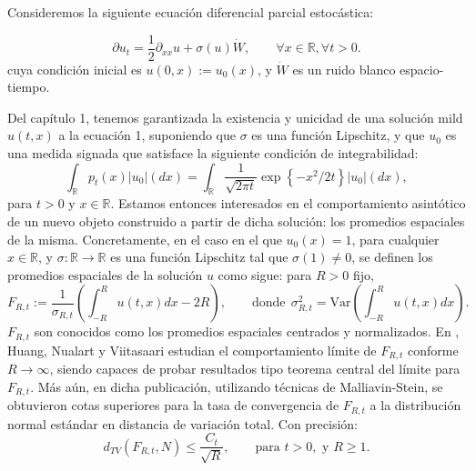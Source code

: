\documentclass[letterpaper,twoside]{book}
\newcommand{\R}{\mathbb{R}}
\newcommand{\1}{\mathds{1}}
\newcommand{\abs}[1]{\left\lvert #1 \right\rvert}
\renewcommand{\to}{\rightarrow}
\theoremstyle{definition}
\theoremstyle{definition}
\theoremstyle{definition}
\theoremstyle{definition}
\theoremstyle{definition}
\theoremstyle{definition}
\theoremstyle{definition}
\begin{document}
Consideremos la siguiente ecuación diferencial parcial estocástica:

\begin{equation}
\partial u_t=\frac{1}{2}\partial_{xx}u+\sigma(u)\dot{W}, \qquad \forall x\in \R, \forall t>0.
\end{equation}
cuya condición inicial es $u(0,x):=u_0(x)$, y $\dot{W}$ es un ruido blanco espacio-tiempo.

Del capítulo 1, tenemos garantizada la existencia y unicidad de una solución mild $u(t,x)$ a la ecuación 1, suponiendo que $\sigma$ es una función Lipschitz, y que $u_0$ es una medida signada que satisface la siguiente condición de integrabilidad:
\[
\int_\R p_t(x)\abs{u_0}(dx)=\int_\R\frac{1}{\sqrt{2\pi t}}\exp \left\{-x^2/2t\right\}\abs{u_0}(dx),    
\]
para $t>0$ y $x\in \R$. Estamos entonces interesados en el comportamiento asintótico de un nuevo objeto construido a partir de dicha solución: los promedios espaciales de la misma. Concretamente, en el caso en el que $u_0(x)=1$, para cualquier $x\in \R$, y $\sigma:\R\to\R$ es una función Lipschitz tal que $\sigma(1)\neq 0$, se definen los promedios espaciales de la solución $u$ como sigue: para $R>0$ fijo, 
\begin{equation}
    F_{R,t}:=\frac{1}{\sigma_{R,t}}\left(\int_{-R}^{R}u(t,x)dx -2R\right), \qquad \text{donde} \ \ \sigma^2_{R,t}=\text{Var}\left(\int_{-R}^{R}u(t,x)dx\right).
\end{equation}
$F_{R,t}$ son conocidos como los promedios espaciales centrados y normalizados. En \cite{HUANG20207170}, Huang, Nualart y Viitasaari estudian el comportamiento límite de $F_{R,t}$ conforme $R\to \infty$, siendo capaces de probar resultados tipo teorema central del límite para $F_{R,t}$. Más aún, en dicha publicación, utilizando técnicas de Malliavin-Stein, se obtuvieron cotas superiores para la tasa de convergencia de $F_{R,t}$ a la distribución normal estándar en distancia de variación total. Con precisión:
\begin{equation}
    d_{TV}(F_{R,t},N)\leq \frac{C_t}{\sqrt{R}}, \qquad \text{para }t>0,\text{ y } R\geq1.  
\end{equation}
\end{document}
